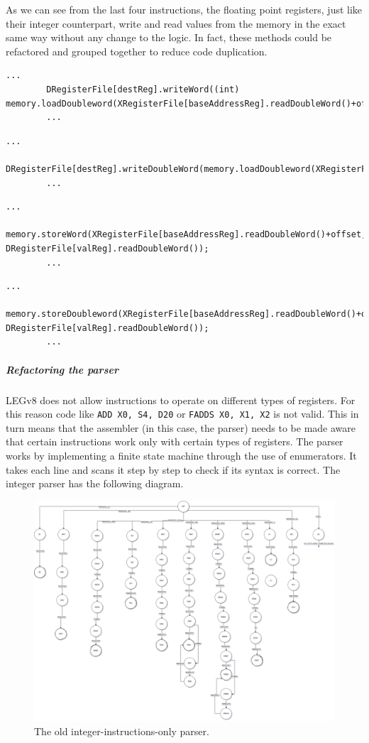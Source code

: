 	As we can see from the last four instructions, the floating point registers, just like their integer counterpart, write and read values from the memory in the exact same way without any change to the logic. In fact, these methods could be refactored and grouped together to reduce code duplication.
	
	\begin{lstlisting}[caption={LDURS}]
		...
		DRegisterFile[destReg].writeWord((int) memory.loadDoubleword(XRegisterFile[baseAddressReg].readDoubleWord()+offset));
		...
	\end{lstlisting}
	\begin{lstlisting}[caption={LDURD}]
		...
		DRegisterFile[destReg].writeDoubleWord(memory.loadDoubleword(XRegisterFile[baseAddressReg].readDoubleWord()+offset));
		...
	\end{lstlisting}
	
	\begin{lstlisting}[caption={STURS}]
		...
		memory.storeWord(XRegisterFile[baseAddressReg].readDoubleWord()+offset, DRegisterFile[valReg].readDoubleWord());
		...
	\end{lstlisting}
	\begin{lstlisting}[caption={STURD}]
		...
		memory.storeDoubleword(XRegisterFile[baseAddressReg].readDoubleWord()+offset, DRegisterFile[valReg].readDoubleWord());
		...
	\end{lstlisting}

\subparagraph*{Refactoring the parser}

LEGv8 does not allow instructions to operate on different types of registers. For this reason code like \verb|ADD X0, S4, D20| or \verb|FADDS X0, X1, X2| is not valid. This in turn means that the assembler (in this case, the parser) needs to be made aware that certain instructions work only with certain types of registers. 
\newline
The parser works by implementing a finite state machine through the use of enumerators. It takes each line and scans it step by step to check if its syntax is correct. The integer parser has the following diagram.

\begin{figure}[H]
	\centering
	\includegraphics[width=\textwidth]{img/parser_diagram.png}
	\caption{The old integer-instructions-only parser.}
\end{figure}

